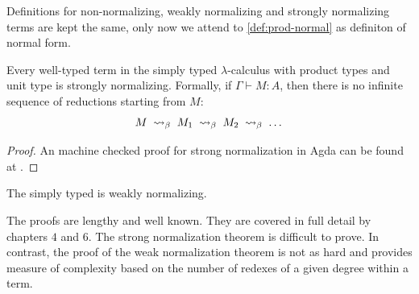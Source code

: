 \begin{remark}
  Definitions for non-normalizing, weakly normalizing and strongly normalizing terms are kept the same, only now we attend to \ref{def:prod-normal} as definiton of normal form.
\end{remark}

\begin{theorem}
\label{thm:sn-stlc-products}
Every well-typed term in the simply typed $\lambda$-calculus with product types and unit type is strongly normalizing. Formally, if $\Gamma \vdash M : A$, then there is no infinite sequence of reductions starting from $M$:
\[
M \;\mathrel{\leadsto}_\beta\; M_1 \;\mathrel{\leadsto}_\beta\; M_2 \;\mathrel{\leadsto}_\beta\; \dots
\]
\end{theorem}
\begin{proof}
  An machine checked proof for strong normalization in Agda can be found at \cite{urciuoli2020strong}.
\end{proof}

\begin{corollary}
  The simply typed \lcalc is weakly normalizing.
\end{corollary}
  
The proofs are lengthy and well known. They are covered in full detail by \cite{girard1989:proofs-and-types} chapters $4$ and $6$. The strong normalization theorem is difficult to prove. In contrast, the proof of the weak normalization theorem is not as hard and provides measure of complexity based on the number of redexes of a given degree within a term.

